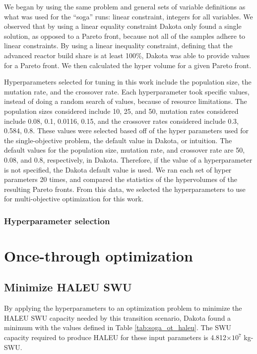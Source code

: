 We began by using the same problem and general sets of variable definitions 
as what was used for the ``soga'' runs: linear constraint, integers for 
all variables. We observed that by using a linear equality constraint
Dakota only found a single solution, as opposed to a Pareto front, because 
not all of the samples adhere to linear constraints. By using a linear 
inequality constraint, defining that the advanced reactor build share is 
at least 100\%, Dakota was able to provide values for a Pareto front. 
We then calculated the hyper volume 
for a given Pareto front. 

Hyperparameters selected for tuning in this work include the 
population size, the mutation rate, and the crossover rate. Each 
hyperparameter took specific values, instead of doing a random 
search of values, because of resource limitations. The population 
sizes considered include 10, 25, and 50, mutation rates considered 
include 0.08, 0.1, 0.0116, 0.15, and the crossover rates 
considered include 0.3, 0.584, 0.8. These values 
were selected based off of the hyper parameters used for the single-objective 
problem, the default value in Dakota, or intuition. The default values for 
the population size, mutation rate, and crossover rate are 50, 
0.08, and 0.8, respectively, in Dakota. Therefore, if the value of a 
hyperparameter is not specified, the Dakota default value is used.  
We ran each set of hyper 
parameters 20 times, and compared the statistics of the hypervolumes of 
the resulting Pareto fronts. From this data, we selected the 
hyperparameters to use for multi-objective optimization for this work. 


\subsubsection{Hyperparameter selection}

\section{Once-through optimization}
\subsection{Minimize HALEU SWU}
By applying the hyperparameters to an optimization problem to minimize the 
\gls{HALEU} \gls{SWU} capacity needed by this transition scenario, Dakota
found a minimum with the values defined in Table \ref{tab:soga_ot_haleu}.
The \gls{SWU} capacity required to produce \gls{HALEU} for these input 
parameters is 4.812$\times 10^7$ kg-SWU.

